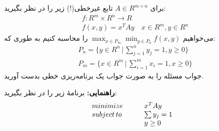 برای 
$A \in R^{m \times n}$
تابع غیرخطی(!) زیر را در نظر بگیرید:
\begin{align*}
    &f: R^m \times R^n \to R \\
    &f(x,y) = x^T A y \quad x \in R^m, y \in R^n
\end{align*}
می‌خواهیم
$\max_{x \in P_m} \min_{y \in P_n} f(x, y)$
را محاسبه کنیم به طوری که:
\begin{align*}
    &P_n = \{y \in R^n \,|\, \sum_{j=1}^n y_j = 1, y \geq 0\} \\
    &P_m = \{x \in R^m \,|\, \sum_{i=1}^m x_i = 1, x \geq 0\} 
\end{align*}
جواب مسئله را به صورت جواب یک برنامه‌ریزی خطی بدست آورید.

\textbf{راهنمایی:}
برنامهٔ زیر را در نظر بگیرید:
\[
    \begin{array}{l l}
        minimize    & \hspace*{20pt} x^T A y       \\
        subject\,to & \hspace*{20pt} \sum y_j = 1  \\
                    & \hspace*{20pt} y \geq 0
    \end{array}
\]
